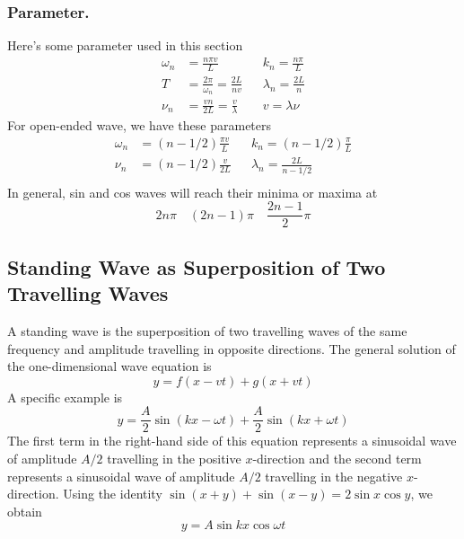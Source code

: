\documentclass[../../../main.tex]{subfiles}
\begin{document}
\subsubsection*{Parameter.} Here's some parameter used in this section
\begin{align*}
    \omega_n&=\frac{n\pi v}{L}&& k_n=\frac{n\pi}{L}\\
    T&=\frac{2\pi}{\omega_n}=\frac{2L}{nv}&&\lambda_n=\frac{2L}{n}\\
    \nu_n&=\frac{vn}{2L}=\frac{v}{\lambda}&&v=\lambda\nu
\end{align*}
For open-ended wave, we have these parameters 
\begin{align*}
    \omega_n&=(n-1/2)\frac{\pi v}{L}&& k_n=(n-1/2)\frac{\pi}{L}\\
    \nu_n&=(n-1/2)\frac{v}{2L}&&\lambda_n=\frac{2L}{n-1/2}\\
\end{align*}
In general, sin and cos waves will reach their minima or maxima at 
\begin{equation*}
    2n\pi\quad(2n-1)\pi\quad\frac{2n-1}{2}\pi
\end{equation*}

\subsection*{Standing Wave as Superposition of Two Travelling Waves}
A standing wave is the superposition of two travelling waves  of the same frequency and amplitude travelling in opposite directions. The general solution of the one-dimensional wave 
equation is
\begin{equation*}
    y = f (x - vt) + g(x + vt)
\end{equation*}
A speciﬁc example is
\begin{equation*}
    y=\frac{A}{2}\sin (kx-\omega t)+\frac{A}{2}\sin (kx+\omega t)
\end{equation*}
The ﬁrst term in the right-hand side of this equation represents a sinusoidal wave of amplitude $A/2$ travelling in the positive $x$-direction and the second term represents a sinusoidal wave of amplitude $A/2$ travelling in the negative $x$-direction. Using the identity $\sin(x + y) + \sin(x - y) = 2 \sin x \cos y$, we obtain
\begin{equation*}
    y=A \sin kx \cos \omega t
\end{equation*}
\end{document}
